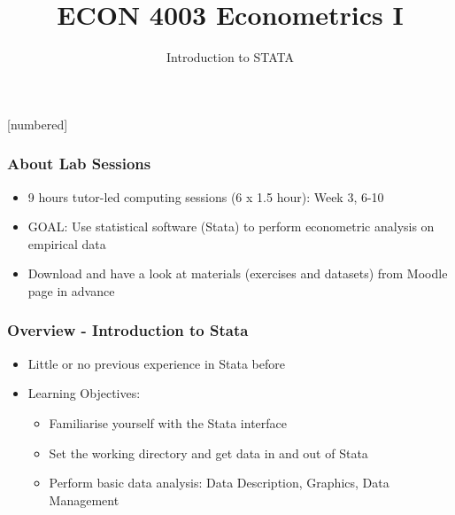 \documentclass[11pt, xcolor=x11names,compress]{beamer}
\title [ECON 4003: Introduction to STATA]{ECON 4003 Econometrics I}
\author[]{Introduction to STATA}
\date{}
\begin{document}
[numbered]
{
\frame{\titlepage}}


\begin{frame}[fragile,t]
\linespread{1.3}
\frametitle{About Lab Sessions}
\begin{itemize}
    \item 9 hours tutor-led computing sessions (6 x 1.5 hour): Week 3, 6-10
    \item GOAL: Use statistical software (Stata) to perform econometric analysis on empirical data
    \item Download and have a look at materials (exercises and datasets) from Moodle page in advance

\end{itemize}


\end{frame}


\begin{frame}[fragile,t]
\linespread{1.3}
\frametitle{Overview - Introduction to Stata}
\begin{itemize}
    \item Little or no previous experience in Stata before
    \item Learning Objectives:
    \begin{itemize}
        \item Familiarise yourself with the Stata interface
        \item Set the working directory and get data in and out of Stata
        \item Perform basic data analysis: Data Description, Graphics, Data Management
    \end{itemize}

\end{itemize}


\end{frame}
\end{document}
